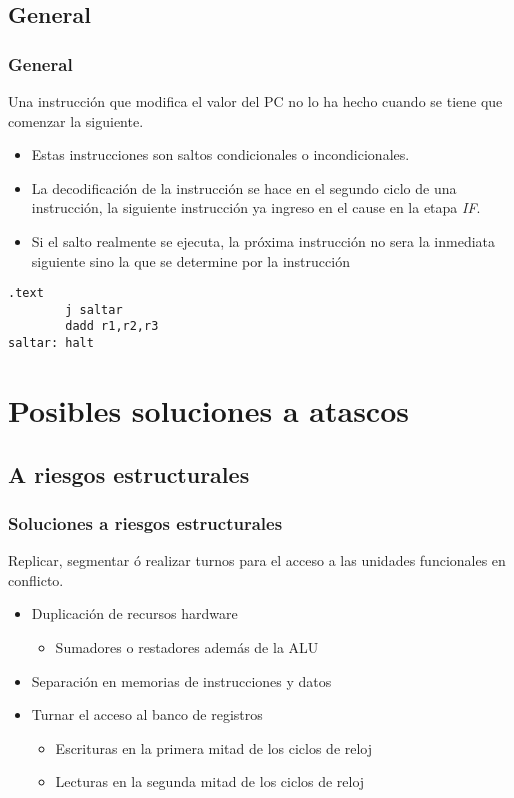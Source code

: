 \documentclass{beamer}
\begin{document}
\subsection{General}
\begin{frame}[fragile]
\frametitle{General}
Una instrucción que modifica el valor del PC no lo ha hecho cuando se tiene que comenzar la siguiente.
\begin{itemize}
\item Estas instrucciones son saltos condicionales o incondicionales.
\item La decodificación de la instrucción se hace en el segundo ciclo de una instrucción, la siguiente instrucción ya ingreso en el cause en la etapa \emph{IF}.
\item Si el salto realmente se ejecuta, la próxima instrucción no sera la inmediata siguiente sino la que se determine por la instrucción
\end{itemize}
\begin{block}{}
\begin{lstlisting}[language=WinMIPS64,basicstyle=\ttfamily,keywordstyle=\color{blue}]
        .text
        j saltar
        dadd r1,r2,r3
saltar: halt
\end{lstlisting}
\end{block}
\end{frame}


\section{Posibles soluciones a atascos}
\subsection{A riesgos estructurales}
\begin{frame}
\frametitle{Soluciones a riesgos estructurales}
Replicar, segmentar ó realizar turnos para el acceso a las unidades funcionales en conflicto.
\begin{itemize}
\item Duplicación de recursos hardware
\begin{itemize}
\item Sumadores o restadores además de la ALU
\end{itemize}
\item Separación en memorias de instrucciones y datos
\item Turnar el acceso al banco de registros
\begin{itemize}
\item Escrituras en la primera mitad de los ciclos de reloj
\item Lecturas en la segunda mitad de los ciclos de reloj
\end{itemize}
\end{itemize}
\end{frame}
\end{document}

